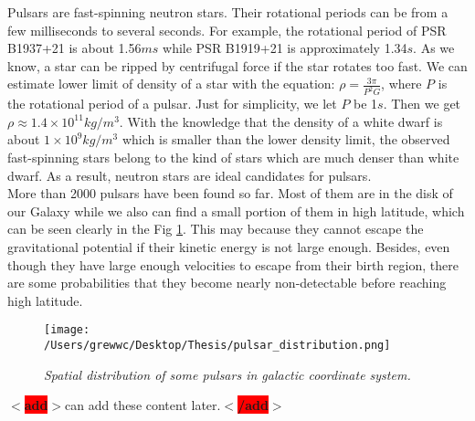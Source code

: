 \documentclass[12pt]{report}
\newcommand{\add}[1]{
  $<$\colorbox{red}{\textbf{add}}$>$#1$<$\colorbox{red}{\textbf{/add}}$>$
}
\begin{document}
        Pulsars are fast-spinning neutron stars. Their rotational periods can be from a few 
        milliseconds
        to several seconds. For example, the rotational period of PSR B1937+21 is about 1.56$ms$ while 
        PSR B1919+21 is approximately 1.34$s$. As we know, a star can be ripped by centrifugal force if the
        star rotates too fast. We can estimate lower limit of density of a star with the equation: 
        $\rho=\frac{3\pi}{P^2G}$, where $P$ is the rotational period of a pulsar. Just for simplicity, we
        let $P$ be 1$s$. Then we get $\rho\approx 1.4\times 10^{11}kg/m^3$. With the knowledge  that the 
        density of a white dwarf is about $1\times 10^9kg/m^3$ which is smaller than the lower density limit,
        the observed fast-spinning stars belong to the kind of stars which are much denser 
        than white dwarf. As a result, neutron stars are ideal candidates for pulsars. \\
        \indent
        More than 2000 pulsars have been found so far. Most of them are in the disk of our Galaxy while we also can 
        find a small portion of them in high latitude, which can be seen clearly in the Fig 
        \ref{fig: spatial_distribution}. This may 
        because they cannot escape the gravitational potential if their kinetic energy is not large enough. Besides,
        even though they have large enough velocities to escape from their birth region, there are some 
        probabilities that they become nearly non-detectable before reaching high latitude. 

        \begin{figure}[h]
          \centering
          \texttt{[image: /Users/grewwc/Desktop/Thesis/pulsar\_distribution.png]}
          \caption{\textit{\footnotesize Spatial distribution of some pulsars in galactic coordinate system.}}
          \label{fig: spatial_distribution}
        \end{figure}
        


        \add{can add these content later.}

\end{document}
